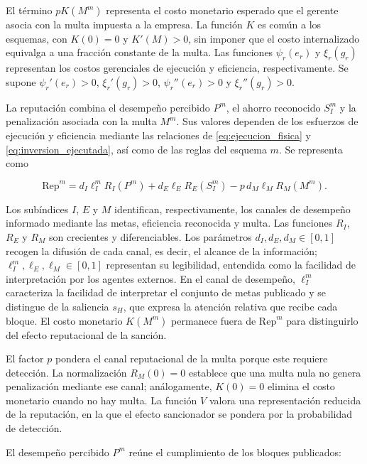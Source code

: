 El término \(pK(M^m)\) representa el costo monetario esperado que el gerente asocia con la multa impuesta a la empresa. La función \(K\) es común a los esquemas, con \(K(0)=0\) y \(K'(M)>0\), sin imponer que el costo internalizado equivalga a una fracción constante de la multa. Las funciones \(\psi_r(e_r)\) y \(\xi_r(g_r)\) representan los costos gerenciales de ejecución y eficiencia, respectivamente. Se supone \(\psi_r'(e_r)>0\), \(\xi_r'(g_r)>0\), \(\psi_r''(e_r)>0\) y \(\xi_r''(g_r)>0\).

La reputación combina el desempeño percibido \(P^m\), el ahorro reconocido \(S_I^m\) y la penalización asociada con la multa \(M^m\). Sus valores dependen de los esfuerzos de ejecución y eficiencia mediante las relaciones de \eqref{eq:ejecucion_fisica} y \eqref{eq:inversion_ejecutada}, así como de las reglas del esquema \(m\). Se representa como

\begin{equation}
\label{eq:reputacion_estructural}
\mathrm{Rep}^m
=
d_I\ell_I^m R_I(P^m)
+
d_E\ell_E R_E(S_I^m)
-
p\,d_M\ell_M R_M(M^m).
\end{equation}

Los subíndices \(I\), \(E\) y \(M\) identifican, respectivamente, los canales de desempeño informado mediante las metas, eficiencia reconocida y multa. Las funciones \(R_I\), \(R_E\) y \(R_M\) son crecientes y diferenciables. Los parámetros \(d_I,d_E,d_M\in[0,1]\) recogen la difusión de cada canal, es decir, el alcance de la información; \(\ell_I^m,\ell_E,\ell_M\in[0,1]\) representan su legibilidad, entendida como la facilidad de interpretación por los agentes externos. En el canal de desempeño, \(\ell_I^m\) caracteriza la facilidad de interpretar el conjunto de metas publicado y se distingue de la saliencia \(s_H\), que expresa la atención relativa que recibe cada bloque. El costo monetario \(K(M^m)\) permanece fuera de \(\mathrm{Rep}^m\) para distinguirlo del efecto reputacional de la sanción.

El factor \(p\) pondera el canal reputacional de la multa porque este requiere detección. La normalización \(R_M(0)=0\) establece que una multa nula no genera penalización mediante ese canal; análogamente, \(K(0)=0\) elimina el costo monetario cuando no hay multa. La función \(V\) valora una representación reducida de la reputación, en la que el efecto sancionador se pondera por la probabilidad de detección.

El desempeño percibido \(P^m\) reúne el cumplimiento de los bloques publicados:

